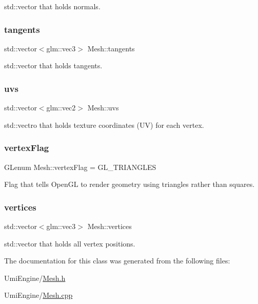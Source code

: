 std\+::vector that holds normals. 

\mbox{\label{class_mesh_aabfc88c0c59371aca2d8fe6227a1c3f1}} 
\subsubsection{\texorpdfstring{tangents}{tangents}}
{\footnotesize\ttfamily std\+::vector$<$glm\+::vec3$>$ Mesh\+::tangents}



std\+::vector that holds tangents. 

\mbox{\label{class_mesh_af98b594a339f9e92ed0a4e1e4d84a6d9}} 
\subsubsection{\texorpdfstring{uvs}{uvs}}
{\footnotesize\ttfamily std\+::vector$<$glm\+::vec2$>$ Mesh\+::uvs}



std\+::vectro that holds texture coordinates (UV) for each vertex. 

\mbox{\label{class_mesh_aa4fa174a34713f4f3286bd202d5d3617}} 
\subsubsection{\texorpdfstring{vertexFlag}{vertexFlag}}
{\footnotesize\ttfamily G\+Lenum Mesh\+::vertex\+Flag = G\+L\+\_\+\+T\+R\+I\+A\+N\+G\+L\+ES}



Flag that tells Open\+GL to render geometry using triangles rather than squares. 

\mbox{\label{class_mesh_aee572fab7113a18cf174a8418394aef4}} 
\subsubsection{\texorpdfstring{vertices}{vertices}}
{\footnotesize\ttfamily std\+::vector$<$glm\+::vec3$>$ Mesh\+::vertices}



std\+::vector that holds all vertex positions. 



The documentation for this class was generated from the following files\+:\begin{DoxyCompactItemize}
\item 
Umi\+Engine/\mbox{\hyperlink{_mesh_8h}{Mesh.\+h}}\item 
Umi\+Engine/\mbox{\hyperlink{_mesh_8cpp}{Mesh.\+cpp}}\end{DoxyCompactItemize}
